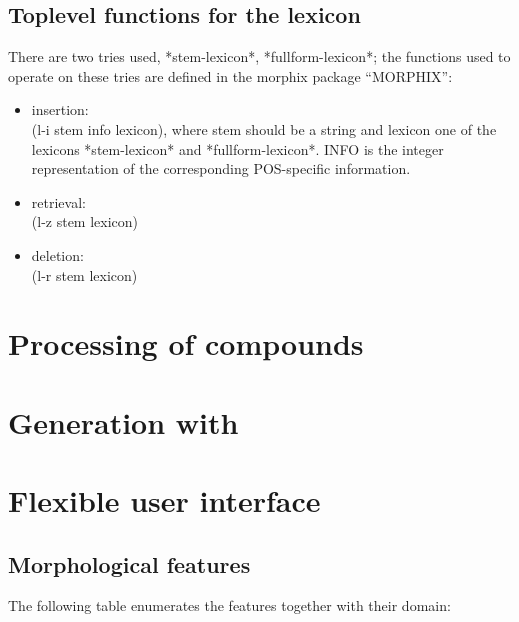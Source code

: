 \subsection{Toplevel functions for the lexicon}

There are two tries used,
*stem-lexicon*, *fullform-lexicon*; the functions used to operate on these
tries are defined in the morphix package ``MORPHIX'':
\begin{itemize}

\item   insertion:\\
        (l-i stem info lexicon), 
        where stem should be a string and lexicon one
        of the lexicons *stem-lexicon* and *fullform-lexicon*. INFO is
        the integer representation of the corresponding POS-specific
        information.

\item   retrieval:\\
        (l-z stem lexicon)

\item   deletion:\\
        (l-r stem lexicon)

\end{itemize}


\section{Processing of compounds}

\section{Generation with \mona}

\section{Flexible user interface}

\subsection{Morphological features}
\label{morph-bnf}

The following table enumerates the features together with
their domain:

